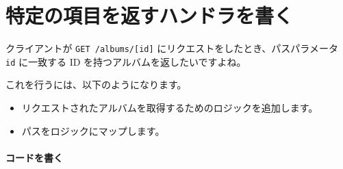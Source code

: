
\section{特定の項目を返すハンドラを書く}

クライアントが \texttt{GET\ /albums/{[}id{]}}
にリクエストをしたとき、パスパラメータ \texttt{id} に一致する ID
を持つアルバムを返したいですよね。

これを行うには、以下のようになります。

\begin{itemize}

\item
  リクエストされたアルバムを取得するためのロジックを追加します。
\item
  パスをロジックにマップします。
\end{itemize}

\paragraph{コードを書く}

